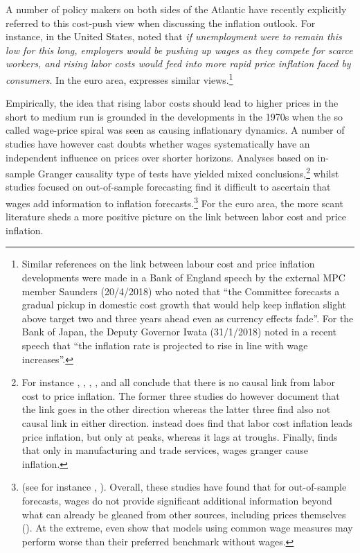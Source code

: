 \documentclass[11pt]{article}
\begin{document}
A number of policy makers on both sides of the Atlantic have recently explicitly referred to this cost-push view when discussing the inflation outlook. For instance, in the United States, \cite{Powell18} noted that \textit{if unemployment were to remain this low for this long, employers would be pushing up wages as they compete for scarce workers, and rising labor costs would feed into more rapid price inflation faced by consumers}. In the euro area, \cite{ECB2018} expresses similar views.\footnote{Similar references on the link between labour cost and price inflation developments were made in a Bank of England speech by the external MPC member Saunders (20/4/2018) who noted that “the Committee forecasts a gradual pickup in domestic cost growth that would help keep inflation slight above target two and three years ahead even as currency effects fade”. For the Bank of Japan, the Deputy Governor Iwata (31/1/2018) noted in a recent speech that “the inflation rate is projected to rise in line with wage increases”.}

Empirically, the idea that rising labor costs should lead to higher prices in the short to medium run is grounded in the developments in the 1970s when the so called wage-price spiral was seen as causing inflationary dynamics. A number of studies have however cast doubts whether wages systematically have an independent influence on prices over shorter horizons. Analyses based on in-sample Granger causality type of tests have yielded mixed conclusions,\footnote{For instance \cite{EmeryChang96},  \cite{Sbordone_02}, \cite{Bidder2015}, \cite{Hess_Schweitzer_2000}, \cite{Gordon_88} and \cite{Darrat1994}  all conclude that there is no causal link from labor cost to price inflation. The former three studies do however document that the link goes in the other direction whereas the latter three find also not causal link in either direction. \cite{Banerji2005} instead does find that labor cost inflation leads price inflation, but only at peaks, whereas it lags at troughs. Finally, \cite{Rissman1995} finds that only in manufacturing and trade services, wages granger cause inflation.} whilst studies focused on out-of-sample forecasting find it difficult to ascertain that wages add information to inflation forecasts.\footnote{(see for instance \cite{Stock_Watson_2008}, \cite{Knotek_Zaman_2014}). Overall, these studies have found that for out-of-sample forecasts, wages do not provide significant additional information beyond what can already be gleaned from other sources, including prices themselves (\cite{Bidder2015}). At the extreme, \cite{Stock_Watson_2008} even show that models using common wage measures may perform worse than their preferred benchmark without wages.} For the euro area, the more scant literature sheds a more positive picture on the link between labor cost and price inflation. 
\end{document}
